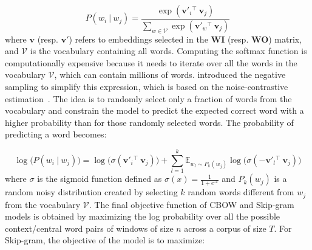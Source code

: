      \begin{equation}
        P(w_i~|~w_j) = \frac{\exp(\mathbf{v'}_{i} {}^\top~ \mathbf{v}_{j})}
              {\sum_{w \in \mathcal{V}} \exp(\mathbf{v'}_{w} {}^\top~ \mathbf{v}_{j})}
      \end{equation}
      where $\mathbf{v}$ (resp. $\mathbf{v'}$) refers to embeddings selected in
      the \textbf{WI} (resp. \textbf{WO}) matrix, and $\mathcal{V}$ is the
      vocabulary containing all words. Computing the softmax function is
      computationally expensive because it needs to iterate over all the words
      in the vocabulary $\mathcal{V}$, which can contain millions of words.
      \citeauthor{mikolov2013efficient} \citep{mikolov2013efficient} introduced
      the negative sampling to simplify this expression, which is based on the
      noise-contrastive estimation~\citep{gutmann2012noise, mnih2012fast}. The
      idea is to randomly select only a fraction of words from the vocabulary
      and constrain the model to predict the expected correct word with a higher
      probability than for those randomly selected words. The probability of
      predicting a word becomes:

      \begin{equation}
        \log\big(P(w_i~|~w_j)\big) =
        \log \big( \sigma(\mathbf{v'}_{i} {}^\top~\mathbf{v}_{j}) \big)
              + \sum_{l=1}^k \mathbb{E}_{w_l \sim P_k(w_j)}
                \log \big( \sigma(\mathbf{-v'}_{l} {}^\top~\mathbf{v}_{j}) \big)
      \end{equation}
      where $\sigma$ is the sigmoid function defined as $\sigma(x) = \frac{1}{1
      + e^{\text{-}x}}$ and $P_k(w_j)$ is a random noisy distribution created by
      selecting $k$ random words different from $w_j$ from the vocabulary
      $\mathcal{V}$. The final objective function of CBOW and Skip-gram models
      is obtained by maximizing the log probability over all the possible
      context/central word pairs of windows of size $n$ across a corpus of size
      $T$. For Skip-gram, the objective of the model is to maximize:

